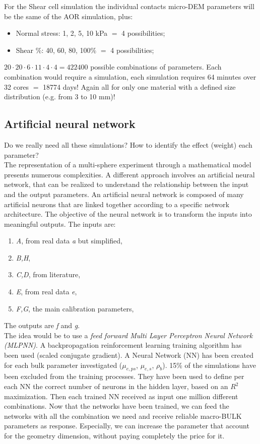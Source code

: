 For the Shear cell simulation the individual contacts micro-DEM parameters will be the same of the AOR simulation, plus:
\begin{itemize}
\item{Normal stress: 1, 2, 5, 10 kPa $=$ 4 possibilities;}
\item{Shear \%: 40, 60, 80, 100\% $=$ 4 possibilities;}
\end{itemize}
$20 \cdot 20 \cdot 6 \cdot 11 \cdot 4 \cdot 4 = 422400$ possible combinations of parameters.
Each combination would require a simulation, each simulation requires 64 minutes over 32 cores $=$ 18774 days!
Again all for only one material with a defined size distribution (e.g. from 3 to 10 mm)!


\subsection{Artificial neural network}
\label{subsection:artificialneuralnetwork}

Do we really need all these simulations?
How to identify the effect (weight) each parameter?\\
The representation of a multi-sphere experiment through a mathematical model presents numerous complexities.
A different approach involves an artificial neural network, that can be realized to understand the relationship between the input and the output parameters.
An artificial neural network is composed of many artificial neurons that are linked together according to a specific network architecture. The objective of the neural network is to transform the inputs into meaningful outputs.
The inputs are:
\begin{enumerate}
\item{\textit{A}, from real data \textit{a} but simplified,}
\item{\textit{B,H},}
\item{\textit{C,D}, from literature,}
\item{\textit{E}, from real data \textit{e},}
\item{\textit{F,G}, the main calibration parameters,}
\end{enumerate}
The outputs are \textit{f} and \textit{g}.\\
The idea would be to use a \textit{feed forward Multi Layer Perceptron Neural Network (MLPNN)}.
A backpropagation reinforcement learning training algorithm has been used (scaled conjugate gradient).
A Neural Network (NN) has been created for each bulk parameter investigated ($\mu_{e,ps}$, $\mu_{e,s}$, $\rho_{b}$).
15\% of the simulations have been excluded from the training processes.
They have been used to define per each NN the correct number of neurons in the hidden layer, based on an $R^2$ maximization.
Then each trained NN received as input one million different combinations.
Now that the networks have been trained, we can feed the networks with all the combination we need and receive reliable macro-BULK parameters as response.
Especially, we can increase the parameter that account for the geometry dimension, without paying completely the price for it.\\

